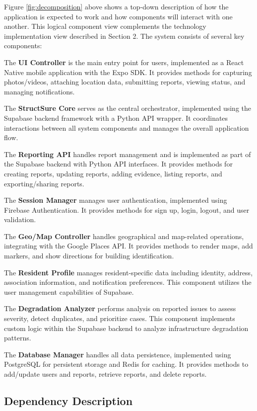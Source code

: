 \documentclass[12pt]{article}
\begin{document}
Figure \ref{fig:decomposition} above shows a top-down description of how the application is expected to work and how components will interact with one another. This logical component view complements the technology implementation view described in Section 2. The system consists of several key components:

The \textbf{UI Controller} is the main entry point for users, implemented as a React Native mobile application with the Expo SDK. It provides methods for capturing photos/videos, attaching location data, submitting reports, viewing status, and managing notifications.

The \textbf{StructSure Core} serves as the central orchestrator, implemented using the Supabase backend framework with a Python API wrapper. It coordinates interactions between all system components and manages the overall application flow.

The \textbf{Reporting API} handles report management and is implemented as part of the Supabase backend with Python API interfaces. It provides methods for creating reports, updating reports, adding evidence, listing reports, and exporting/sharing reports.

The \textbf{Session Manager} manages user authentication, implemented using Firebase Authentication. It provides methods for sign up, login, logout, and user validation.

The \textbf{Geo/Map Controller} handles geographical and map-related operations, integrating with the Google Places API. It provides methods to render maps, add markers, and show directions for building identification.

The \textbf{Resident Profile} manages resident-specific data including identity, address, association information, and notification preferences. This component utilizes the user management capabilities of Supabase.

The \textbf{Degradation Analyzer} performs analysis on reported issues to assess severity, detect duplicates, and prioritize cases. This component implements custom logic within the Supabase backend to analyze infrastructure degradation patterns.

The \textbf{Database Manager} handles all data persistence, implemented using PostgreSQL for persistent storage and Redis for caching. It provides methods to add/update users and reports, retrieve reports, and delete reports.

\subsection{Dependency Description}
\end{document}
